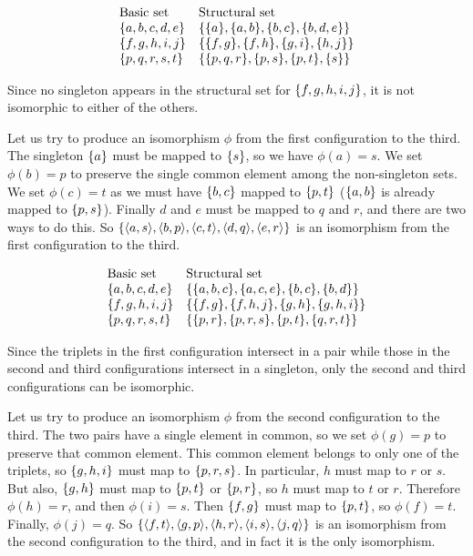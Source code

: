 \documentclass{report}
\begin{document}
\begin{exercise}
\[
\begin{array}{ll}
    \text{Basic set} & \text{Structural set}\\
    \set{a,b,c,d,e} & \set{\set{a},\set{a,b},\set{b,c},\set{b,d,e}}\\
    \set{f,g,h,i,j} & \set{\set{f,g},\set{f,h},\set{g,i},\set{h,j}}\\
    \set{p,q,r,s,t} & \set{\set{p,q,r},\set{p,s},\set{p,t},\set{s}}
\end{array}
\]
\end{exercise}

\begin{solution}
Since no singleton appears in the structural set for $\left\{f, g, h,i,j\right\}$, it is not isomorphic
to either of the others.

Let us try to produce an isomorphism $\phi$ from the first configuration to the third.
The singleton $\left\{a\right\}$ must be mapped to $\left\{s\right\}$, so we have $\phi(a)=s$.
We set $\phi(b)=p$ to preserve the single common element among the non-singleton sets.
We set $\phi(c)=t$ as we must have $\left\{b,c\right\}$ mapped to $\left\{p,t\right\}$ ($\left\{a,b\right\}$ is already mapped to $\left\{p,s\right\}$).
Finally $d$ and $e$ must be mapped to $q$ and $r$, and there are two ways to do this.
So $\set{\aprn{a,s},\aprn{b,p},\aprn{c,t},\aprn{d,q},\aprn{e,r}}$ is an isomorphism from the
first configuration to the third.
\end{solution}

\begin{exercise}
\[
\begin{array}{ll}
    \text{Basic set} & \text{Structural set}\\
    \set{a,b,c,d,e} & \set{\set{a,b,c},\set{a,c,e},\set{b,c},\set{b,d}}\\
    \set{f,g,h,i,j} & \set{\set{f,g},\set{f,h,j},\set{g,h},\set{g,h,i}}\\
    \set{p,q,r,s,t} & \set{\set{p,r},\set{p,r,s},\set{p,t},\set{q,r,t}}
\end{array}
\]
\end{exercise}

\begin{solution}
Since the triplets in the first configuration intersect in a pair while those in the second
and third configurations intersect in a singleton, only the second and third configurations
can be isomorphic.

Let us try to produce an isomorphism $\phi$ from the second configuration to the third.
The two pairs have a single element in common, so we set $\phi(g)=p$ to preserve that common element.
This common element belongs to only one of the triplets, so $\left\{g,h,i\right\}$ must map to $\left\{p,r,s\right\}$.
In particular, $h$ must map to $r$ or $s$. But also, $\left\{g,h\right\}$ must map to $\left\{p,t\right\}$ or $\left\{p,r\right\}$,
so $h$ must map to $t$ or $r$. Therefore $\phi(h)=r$, and then $\phi(i)=s$.
Then $\left\{f,g\right\}$ must map to $\left\{p,t\right\}$, so $\phi(f)=t$. Finally, $\phi(j)=q$.
So $\set{\aprn{f,t},\aprn{g,p},\aprn{h,r},\aprn{i,s},\aprn{j,q}}$ is an isomorphism
from the second configuration to the third, and in fact it is the only isomorphism.
\end{solution}
\end{document}
